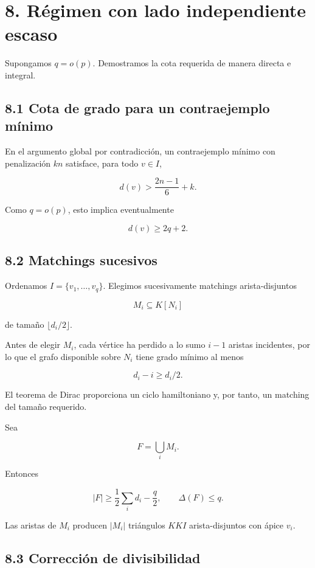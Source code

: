 \documentclass[
  11pt,
]{article}
\begin{document}
\section{8. Régimen con lado independiente
escaso}\label{ruxe9gimen-con-lado-independiente-escaso}

Supongamos \(q=o(p)\). Demostramos la cota requerida de manera directa e
integral.

\subsection{8.1 Cota de grado para un contraejemplo
mínimo}\label{cota-de-grado-para-un-contraejemplo-muxednimo}

En el argumento global por contradicción, un contraejemplo mínimo con
penalización \(kn\) satisface, para todo \(v\in I\),

\[
d(v)>
\frac{2n-1}{6}+k.
\tag{8.1}
\]

Como \(q=o(p)\), esto implica eventualmente

\[
d(v)\ge2q+2.
\tag{8.2}
\]

\subsection{8.2 Matchings sucesivos}\label{matchings-sucesivos}

Ordenamos \(I=\{v_1,\ldots,v_q\}\). Elegimos sucesivamente matchings
arista-disjuntos

\[
M_i\subseteq K[N_i]
\]

de tamaño \(\lfloor d_i/2\rfloor\).

Antes de elegir \(M_i\), cada vértice ha perdido a lo sumo \(i-1\)
aristas incidentes, por lo que el grafo disponible sobre \(N_i\) tiene
grado mínimo al menos

\[
d_i-i\ge d_i/2.
\]

El teorema de Dirac proporciona un ciclo hamiltoniano y, por tanto, un
matching del tamaño requerido.

Sea

\[
F=\bigcup_iM_i.
\]

Entonces

\[
|F|
\ge
\frac12\sum_i d_i-\frac q2,
\qquad
\Delta(F)\le q.
\tag{8.3}
\]

Las aristas de \(M_i\) producen \(|M_i|\) triángulos \(KKI\)
arista-disjuntos con ápice \(v_i\).

\subsection{8.3 Corrección de
divisibilidad}\label{correcciuxf3n-de-divisibilidad}
\end{document}
